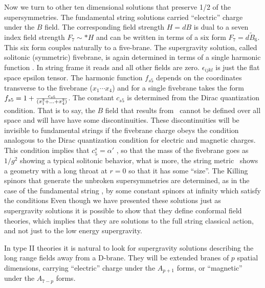 Now we turn to other ten dimensional solutions that
preserve 1/2 of the supersymmetries. 
The fundamental string solutions carried 
``electric'' charge under the $B$ field.
 The corresponding field strength 
$ H = d B$ is dual to a seven index field strength
$ F_7 \sim   * H$ and can be written in terms of 
a six form $ F_7 = d \tilde{B}_6 $. This six form couples
naturally to a five-brane. 
The supergravity solution, called solitonic (symmetric) fivebrane, 
 is again determined in terms of a single 
harmonic function \callanfive .
 In string frame it reads 
\eqn{}
and  all other fields are zero. $\epsilon_{ijkl}$  is just the 
flat space epsilon tensor. 
The  harmonic function $f_{s5}$  depends on the coordinates 
transverse to the fivebrane ($x_1 \cdots x_4$) and for
a single fivebrane takes the form
 $f_{s5} = 1 + { c_{s5} \over (x_1^2 +...+x_4^2)}
$.
The constant $c_{s5}$ is determined from the Dirac quantization 
condition. That is to say, the $B$ field that  results from
\fivebrane\ cannot be defined over all space and will have
have some discontinuities. These  discontinuities will be 
invisible to fundamental strings if the fivebrane
charge obeys the condition analogous to the Dirac 
quantization condition for electric and magnetic
charges. This  condition
implies that $c_5^s = \alpha' $ \callanfive , so
 that the mass of the fivebrane goes
as $ 1/g^2 $ showing a typical solitonic
behavior, what is more, the string  metric \fivebrane\ shows
a geometry with a long throat at $r=0$ so that it has
some ``size''. 
The Killing spinors that generate the unbroken supersymmetries
are determined, as in the case of the fundamental string 
\susyspinors ,
by some constant spinors at infinity which 
satisfy the conditions
\eqn{} 
Even though we have presented these solutions just
 as supergravity solutions it is possible to show that
they define conformal field theories, which implies that
they are solutions to the full string classical action, and
not just to the low energy supergravity. 



In type II theories it is natural to look for 
supergravity solutions describing the long range fields
away from  a D-brane. They will be extended branes of $p$ spatial 
dimensions, carrying ``electric'' charge under 
the $A_{p+1}$ forms, or ``magnetic'' under the $A_{7-p}$ 
forms.

